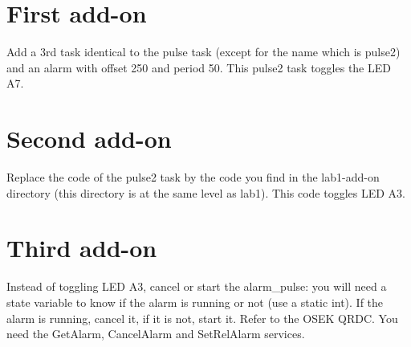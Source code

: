 \documentclass[11pt]{report}
\newcommand{\namedtodo}[2][]{%
{%
\todo[color={yellow!50},size=\small]{%
\textbf{TODO [\uppercase{#1}]:}~#2}%
}}
\newtheorem{ex}{Question}
\begin{document}





\section{First add-on}

Add a 3rd task identical to the pulse task (except for the name which is pulse2) and an alarm with offset 250 and period 50. This pulse2 task toggles the LED A7.

\section{Second add-on}

Replace the code of the pulse2 task by the code you find in the lab1-add-on directory (this directory is at the same level as lab1). This code toggles LED A3.

\section{Third add-on}

Instead of toggling LED A3, cancel or start the alarm_pulse: you will need a state variable to know if the alarm is running or not (use a static int). If the alarm is running, cancel it, if it is not, start it. Refer to the OSEK QRDC. You need the GetAlarm, CancelAlarm and SetRelAlarm services.



%
\end{document}
